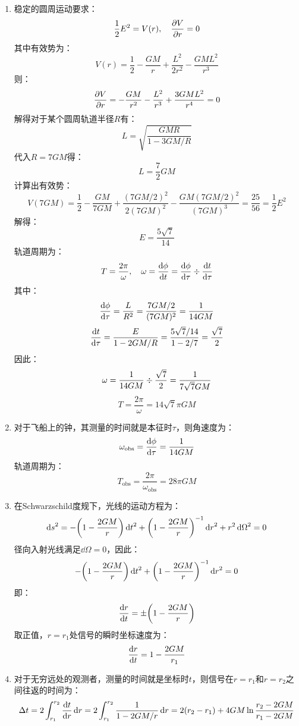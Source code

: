 \documentclass[a4paper]{article}
\renewcommand\div\divisionsymbol
\begin{document}
\begin{enumerate}
    \item[6.(a)]
    稳定的圆周运动要求：
    \[
        \frac{1}{2}E^2 = V(r),\quad \pdv{V}{r} = 0
    \]
    其中有效势为：
    \[
        V(r) = \frac{1}{2} - \frac{GM}{r} + \frac{L^2}{2r^2} - \frac{GM L^2}{r^3}
    \]
    则：
    \[
        \pdv{V}{r} = -\frac{GM}{r^2} - \frac{L^2}{r^3} + \frac{3GM L^2}{r^4} = 0
    \]
    解得对于某个圆周轨道半径$R$有：
    \[
        L = \sqrt{\frac{GMR}{1 - 3GM/R}}
    \]
    代入$R = 7GM$得：
    \[
        L = \frac{7}{2}GM
    \]
    计算出有效势：
    \[
        V(7GM) = \frac{1}{2} - \frac{GM}{7GM} + \frac{(7GM/2)^2}{2(7GM)^2} - \frac{GM (7GM/2)^2}{(7GM)^3} = \frac{25}{56} = \frac{1}{2}E^2
    \]
    解得：
    \[
        E = \frac{5\sqrt{7}}{14}
    \]
    轨道周期为：
    \[
        T = \frac{2\pi}{\omega},\quad \omega = \dv{\phi}{t} = \dv{\phi}{\tau} \div \dv{t}{\tau}
    \]
    其中：
    \[
        \dv{\phi}{\tau} = \frac{L}{R^2} = \frac{7GM/2}{(7GM)^2} = \frac{1}{14 GM}
    \]
    \[
        \dv{t}{\tau} = \frac{E}{1 - 2GM/R} = \frac{5\sqrt{7}/14}{1 - 2/7} = \frac{\sqrt{7}}{2}
    \]
    因此：
    \[
        \omega = \frac{1}{14 GM} \div \frac{\sqrt{7}}{2} = \frac{1}{7\sqrt{7} GM}
    \]
    \[
        T = \frac{2\pi}{\omega} = 14\sqrt{7}\pi GM
    \]

    \item[6.(b)]
    对于飞船上的钟，其测量的时间就是本征时$\tau$，则角速度为：
    \[
        \omega_{\mathrm{obs}} = \dv{\phi}{\tau} = \frac{1}{14 GM}
    \]
    轨道周期为：
    \[
        T_{\mathrm{obs}} = \frac{2\pi}{\omega_{\mathrm{obs}}} = 28\pi GM
    \]

    \item[7.(a)]
    在Schwarzschild度规下，光线的运动方程为：
    \[
        \dd{s}^2 = -\qty(1 - \frac{2GM}{r}) \dd{t}^2 + \qty(1 - \frac{2GM}{r})^{-1} \dd{r}^2 + r^2 \dd{\Omega}^2 = 0
    \]
    径向入射光线满足$\dd{\Omega} = 0$，因此：
    \[
        -\qty(1 - \frac{2GM}{r}) \dd{t}^2 + \qty(1 - \frac{2GM}{r})^{-1} \dd{r}^2 = 0
    \]
    即：
    \[
        \dv{r}{t} = \pm \qty(1 - \frac{2GM}{r})
    \]
    取正值，$r = r_1$处信号的瞬时坐标速度为：
    \[
        \dv{r}{t} = 1 - \frac{2GM}{r_1}
    \]

    \item[7.(b)]
    对于无穷远处的观测者，测量的时间就是坐标时$t$，则信号在$r = r_1$和$r = r_2$之间往返的时间为：
    \[
        \Delta t = 2\int_{r_1}^{r_2} \dv{t}{r} \dd{r} = 2\int_{r_1}^{r_2} \frac{1}{1 - 2GM/r} \dd{r} = 2(r_2 - r_1) + 4GM \ln\frac{r_2 - 2GM}{r_1 - 2GM}
    \]


\end{enumerate}
\end{document}

